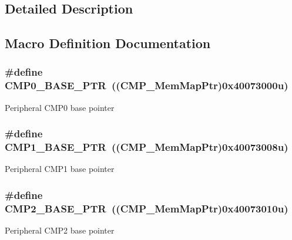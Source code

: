 \subsection{Detailed Description}


\subsection{Macro Definition Documentation}
\hypertarget{group___c_m_p___peripheral_ga5a7a6b1d0743a05435ba5cb2dc2b3431}{}
\subsubsection[{C\+M\+P0\+\_\+\+B\+A\+S\+E\+\_\+\+P\+T\+R}]{\setlength{\rightskip}{0pt plus 5cm}\#define C\+M\+P0\+\_\+\+B\+A\+S\+E\+\_\+\+P\+T\+R~(({\bf C\+M\+P\+\_\+\+Mem\+Map\+Ptr})0x40073000u)}\label{group___c_m_p___peripheral_ga5a7a6b1d0743a05435ba5cb2dc2b3431}
Peripheral C\+M\+P0 base pointer \hypertarget{group___c_m_p___peripheral_ga91e89d9d49a3f251dcd9026ad403a3e8}{}
\subsubsection[{C\+M\+P1\+\_\+\+B\+A\+S\+E\+\_\+\+P\+T\+R}]{\setlength{\rightskip}{0pt plus 5cm}\#define C\+M\+P1\+\_\+\+B\+A\+S\+E\+\_\+\+P\+T\+R~(({\bf C\+M\+P\+\_\+\+Mem\+Map\+Ptr})0x40073008u)}\label{group___c_m_p___peripheral_ga91e89d9d49a3f251dcd9026ad403a3e8}
Peripheral C\+M\+P1 base pointer \hypertarget{group___c_m_p___peripheral_ga732cbf43f95d2d1cd01b4204263940ab}{}
\subsubsection[{C\+M\+P2\+\_\+\+B\+A\+S\+E\+\_\+\+P\+T\+R}]{\setlength{\rightskip}{0pt plus 5cm}\#define C\+M\+P2\+\_\+\+B\+A\+S\+E\+\_\+\+P\+T\+R~(({\bf C\+M\+P\+\_\+\+Mem\+Map\+Ptr})0x40073010u)}\label{group___c_m_p___peripheral_ga732cbf43f95d2d1cd01b4204263940ab}
Peripheral C\+M\+P2 base pointer \hypertarget{group___c_m_p___peripheral_ga793306a1014f5112aa61f346fe3bb2c0}{}
